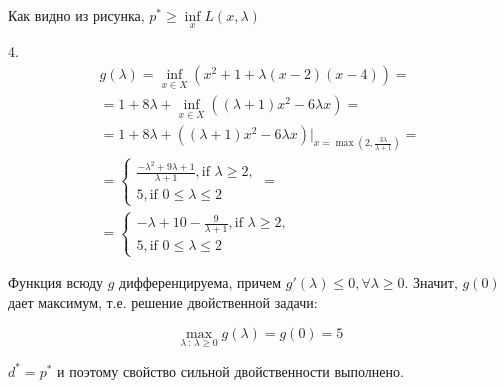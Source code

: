 \documentclass[12pt]{article}
\begin{document}
Как видно из рисунка, $p^* \geq \inf\limits_x L(x,\lambda)$

4. 
\begin{equation}
\begin{split}
g(\lambda) = \inf\limits_{x\in X} (x^2 + 1 + \lambda(x-2)(x-4)) = \\
=  1 + 8\lambda + \inf\limits_{x \in X}((\lambda + 1)x^2 -6\lambda x)=\\
= 1 + 8\lambda + \left((\lambda + 1)x^2 -6\lambda x\right)\Big|_{x = \max\left(2,\frac{3\lambda}{\lambda + 1}\right)}=\\
= \begin{cases}
\frac{-\lambda^2 + 9\lambda + 1}{\lambda+1},\text{if $\lambda \geq 2$},\\
5,  \text{if $0\leq \lambda \leq 2$}
\end{cases} =\\
= \begin{cases}
-\lambda + 10 - \frac{9}{\lambda+1},\text{if $\lambda \geq 2$},\\
5,  \text{if $0\leq \lambda \leq 2$}
\end{cases}
\end{split} 
\end{equation}

Функция всюду $g$ дифференцируема, причем $g'(\lambda) \leq 0, \forall \lambda \geq 0$. Значит, $g(0)$ дает  максимум, т.е. решение двойственной задачи:

$$\boxed{\max_{\lambda\,:\,\lambda\geq 0}g(\lambda) = g(0) = 5}$$

$d^* = p^*$ и поэтому свойство сильной двойственности выполнено.
\end{document}
